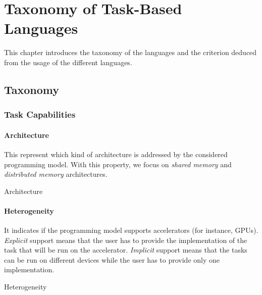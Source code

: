 \chapter{Taxonomy of Task-Based Languages}
\label{chap:taxonomy}

This chapter introduces the taxonomy of the languages and the criterion deduced from the usage of the different languages.

\section{Taxonomy}

\subsection{Task Capabilities}

\subsubsection{Architecture}
This represent which kind of architecture is addressed by the considered programming model.
With this property, we focus on \textit{shared memory} and \textit{distributed memory} architectures.
\begin{table}[H]
	\caption{Architecture}
	\centering
	\begin{multicols}{2}
		

		
	\end{multicols}
\end{table}


\subsubsection{Heterogeneity}
It indicates if the programming model supports accelerators (for instance, GPUs).
\textit{Explicit} support means that the user has to provide the implementation of the task that will be run on the accelerator.
\textit{Implicit} support means that the tasks can be run on different devices while the user has to provide only one implementation.
\begin{table}[H]
	\caption{Heterogeneity}
	\centering
	\begin{multicols}{2}
		

		
	\end{multicols}
\end{table}

